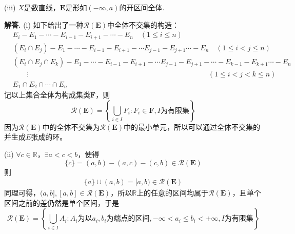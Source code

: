 \documentclass[12pt, a4paper, oneside]{ctexart}
\newenvironment{solution}{\par\noindent\textbf{解答. }}{\bigskip\par}
\begin{document}
(iii) $X$是数直线，$\mathbf{E}$是形如$(-\infty, a)$的开区间全体.
\begin{solution}
    (i) 如下给出了一种$\mathcal{R}(\mathbf{E})$中全体不交集的构造：
    \begin{equation*}
        \begin{aligned}
            &E_i-E_1-\cdots-E_{i-1}-E_{i+1}-\cdots-E_n\quad(1\leqslant i\leqslant n)\\
            &(E_i\cap E_j)-E_1-\cdots-E_{i-1}-E_{i+1}-\cdots E_{j-1}-E_{j+1}\cdots-E_n\quad(1\leqslant i < j\leqslant n)\\
            &(E_i\cap E_j\cap E_k)-E_1-\cdots-E_{i-1}-E_{i+1}-\cdots E_{j-1}-E_{j+1}-\cdots-E_{k-1}-E_{k+1}\cdots-E_n\\
            &\quad\quad\vdots\qquad\qquad\qquad\qquad\qquad\quad\qquad\qquad\qquad\qquad\qquad\qquad\qquad(1\leqslant i < j <k\leqslant n)\\
            &E_1\cap E_2\cap \cdots\cap E_n
        \end{aligned}
    \end{equation*}
    记以上集合全体为构成集类$\mathbf{F}$，则
    \begin{equation*}
        \mathcal{R}(\mathbf{E}) = \left\{\bigcup_{i\in I}F_i: F_i\in \mathbf{F},I\text{为有限集}\right\}
    \end{equation*}
    因为$\mathcal{R}(\mathbf{E})$中的全体不交集为$\mathcal{R}(\mathbf{E})$中的最小单元，所以可以通过全体不交集的并生成$E$张成的环。

    (ii) $\forall c\in\mathbb{R}$，$\exists a < c < b$，使得
    \begin{equation*}
        \{c\} = (a, b) - (a , c)-(c,b)\in\mathcal{R}(\mathbf{E})
    \end{equation*}
    则
    \begin{equation*}
        \begin{aligned}
            \{a\}\cup(a,b)=[a,b)\in\mathcal{R}(\mathbf{E})
        \end{aligned}
    \end{equation*}
    同理可得，$(a,b], [a,b]\in\mathcal{R}(\mathbf{E})$，所以$\mathbb{R}$上的任意的区间均属于$\mathcal{R}(\mathbf{E})$，且单个区间之前的差仍然是单个区间，于是
    \begin{equation*}
        \mathcal{R}(\mathbf{E}) = \left\{\bigcup_{i\in I}A_i:A_i\text{为以}a_i,b_i\text{为端点的区间},-\infty<a_i\leqslant b_i<+\infty, I\text{为有限集}\right\}
    \end{equation*}


\end{solution}
\end{document}
